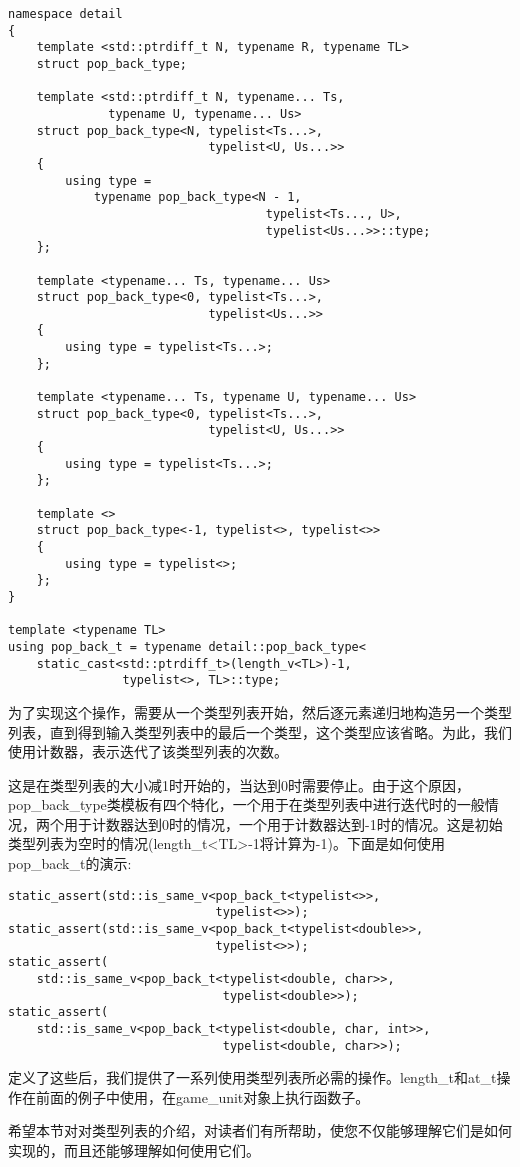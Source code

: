 \begin{lstlisting}[style=styleCXX]
namespace detail
{
	template <std::ptrdiff_t N, typename R, typename TL>
	struct pop_back_type;
	
	template <std::ptrdiff_t N, typename... Ts,
			  typename U, typename... Us>
	struct pop_back_type<N, typelist<Ts...>,
							typelist<U, Us...>>
	{
		using type =
			typename pop_back_type<N - 1,
									typelist<Ts..., U>,
									typelist<Us...>>::type;
	};

	template <typename... Ts, typename... Us>
	struct pop_back_type<0, typelist<Ts...>,
							typelist<Us...>>
	{
		using type = typelist<Ts...>;
	};

	template <typename... Ts, typename U, typename... Us>
	struct pop_back_type<0, typelist<Ts...>,
							typelist<U, Us...>>
	{
		using type = typelist<Ts...>;
	};

	template <>
	struct pop_back_type<-1, typelist<>, typelist<>>
	{
		using type = typelist<>;
	};
}

template <typename TL>
using pop_back_t = typename detail::pop_back_type<
	static_cast<std::ptrdiff_t>(length_v<TL>)-1,
				typelist<>, TL>::type;
\end{lstlisting}

为了实现这个操作，需要从一个类型列表开始，然后逐元素递归地构造另一个类型列表，直到得到输入类型列表中的最后一个类型，这个类型应该省略。为此，我们使用计数器，表示迭代了该类型列表的次数。

这是在类型列表的大小减1时开始的，当达到0时需要停止。由于这个原因，pop\_back\_type类模板有四个特化，一个用于在类型列表中进行迭代时的一般情况，两个用于计数器达到0时的情况，一个用于计数器达到-1时的情况。这是初始类型列表为空时的情况(length\_t<TL>-1将计算为-1)。下面是如何使用pop\_back\_t的演示:

\begin{lstlisting}[style=styleCXX]
static_assert(std::is_same_v<pop_back_t<typelist<>>,
							 typelist<>>);
static_assert(std::is_same_v<pop_back_t<typelist<double>>,
							 typelist<>>);
static_assert(
	std::is_same_v<pop_back_t<typelist<double, char>>,
							  typelist<double>>);
static_assert(
	std::is_same_v<pop_back_t<typelist<double, char, int>>,
							  typelist<double, char>>);
\end{lstlisting}

定义了这些后，我们提供了一系列使用类型列表所必需的操作。length\_t和at\_t操作在前面的例子中使用，在game\_unit对象上执行函数子。

希望本节对对类型列表的介绍，对读者们有所帮助，使您不仅能够理解它们是如何实现的，而且还能够理解如何使用它们。



















